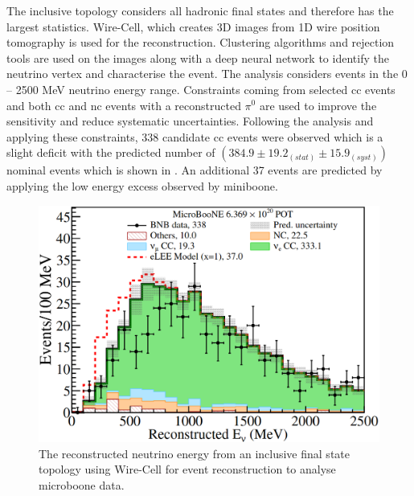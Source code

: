 The inclusive topology considers all hadronic final states and therefore has the largest statistics. Wire-Cell, which creates 3D images from 1D wire position tomography is used for the reconstruction. Clustering algorithms and rejection tools are used on the images along with a deep neural network to identify the neutrino vertex and characterise the event. The analysis considers events in the 0 -- 2500 MeV neutrino energy range. Constraints coming from selected \numu \gls{cc} events and both \gls{cc} and \gls{nc} events with a reconstructed $\pi^0$ are used to improve the sensitivity and reduce systematic uncertainties. Following the \nue analysis and applying these constraints, 338 candidate \nue \gls{cc} events were observed which is a slight deficit with the predicted number of $(384.9 \pm 19.2_{(stat)} \pm 15.9_{(syst)})$ nominal events which is shown in . An additional 37 events are predicted by applying the low energy excess observed by \gls{miniboone}.

\begin{figure}[h!]
    \centering
    \includegraphics[width = \largefigwidth]{figures-chap2/microboone_inclusive.png}
    \caption[Reconstructed neutrino energy from \gls{microboone} data using an inclusive final state topology for a \nue analysis.]{The reconstructed neutrino energy from an inclusive final state topology using Wire-Cell for event reconstruction to analyse \gls{microboone} data\cite{Search_for_an_Excess_of_Electron_Neutrino_Interactions_in_MicroBooNE_Using_Multiple_Final_State_Topologies}.}
    \label{fig:microboone_inclusive}
\end{figure}


